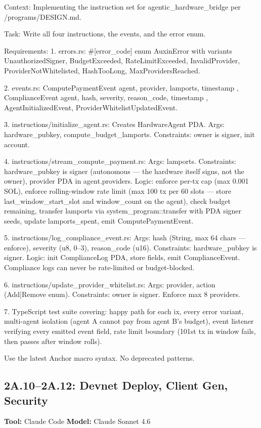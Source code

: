 \documentclass[11pt, a4paper]{article}
\begin{document}
\begin{promptbox}
Context: Implementing the instruction set for agentic_hardware_bridge per /programs/DESIGN.md.

Task: Write all four instructions, the events, and the error enum.

Requirements:
1. errors.rs: #[error_code] enum AuxinError with variants UnauthorizedSigner, BudgetExceeded, RateLimitExceeded, InvalidProvider, ProviderNotWhitelisted, HashTooLong, MaxProvidersReached.

2. events.rs: ComputePaymentEvent { agent, provider, lamports, timestamp }, ComplianceEvent { agent, hash, severity, reason_code, timestamp }, AgentInitializedEvent, ProviderWhitelistUpdatedEvent.

3. instructions/initialize_agent.rs: Creates HardwareAgent PDA. Args: hardware_pubkey, compute_budget_lamports. Constraints: owner is signer, init account.

4. instructions/stream_compute_payment.rs: Args: lamports. Constraints: hardware_pubkey is signer (autonomous --- the hardware itself signs, not the owner), provider PDA in agent.providers. Logic: enforce per-tx cap (max 0.001 SOL), enforce rolling-window rate limit (max 100 tx per 60 slots --- store last_window_start_slot and window_count on the agent), check budget remaining, transfer lamports via system_program::transfer with PDA signer seeds, update lamports_spent, emit ComputePaymentEvent.

5. instructions/log_compliance_event.rs: Args: hash (String, max 64 chars --- enforce), severity (u8, 0--3), reason_code (u16). Constraints: hardware_pubkey is signer. Logic: init ComplianceLog PDA, store fields, emit ComplianceEvent. Compliance logs can never be rate-limited or budget-blocked.

6. instructions/update_provider_whitelist.rs: Args: provider, action (Add|Remove enum). Constraints: owner is signer. Enforce max 8 providers.

7. TypeScript test suite covering: happy path for each ix, every error variant, multi-agent isolation (agent A cannot pay from agent B's budget), event listener verifying every emitted event field, rate limit boundary (101st tx in window fails, then passes after window rolls).

Use the latest Anchor macro syntax. No deprecated patterns.
\end{promptbox}

\subsection*{2A.10--2A.12: Devnet Deploy, Client Gen, Security}
\textbf{Tool:} Claude Code \quad \textbf{Model:} Claude Sonnet 4.6
\end{document}
